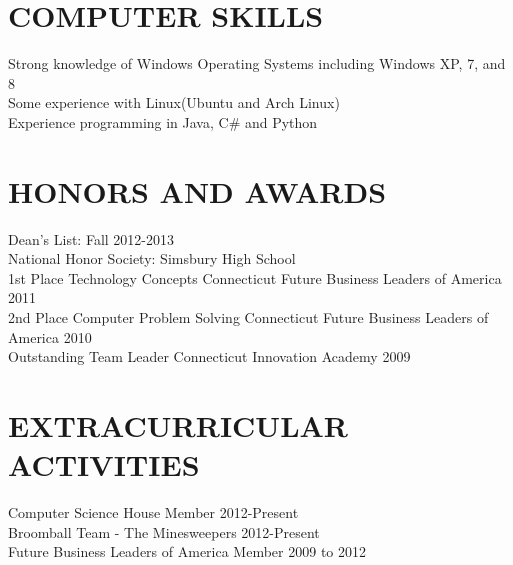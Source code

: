\documentclass{res}
\begin{document}
\begin{resume}
\section{COMPUTER SKILLS}   
    \vspace{2pt}       
    Strong knowledge of Windows Operating Systems including Windows XP, 7, and 8\\
    Some experience with Linux(Ubuntu and Arch Linux) \\
    Experience programming in Java, C\# and Python\\
     
\section{HONORS AND AWARDS}          
    \vspace{2pt}
    Dean's List: Fall 2012-2013  \\        
    National Honor Society: Simsbury High School  \\        
    1st Place Technology Concepts Connecticut Future Business Leaders of America  2011\\        
    2nd Place Computer Problem Solving Connecticut Future Business Leaders of America 2010\\
    Outstanding Team Leader Connecticut Innovation Academy 2009
 
\section{EXTRACURRICULAR ACTIVITIES}        
    \vspace{2pt}
    Computer Science House Member 2012-Present \\  
    Broomball Team - The Minesweepers 2012-Present\\     
    Future Business Leaders of America Member 2009 to 2012   
 
\end{resume}
\end{document}
